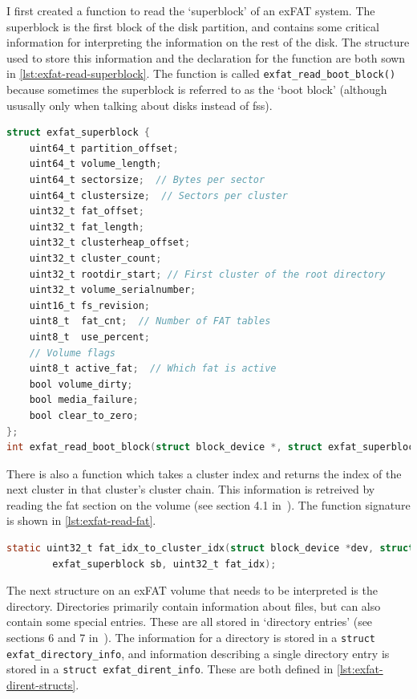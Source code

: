 \documentclass{article}
\begin{document}
I first created a function to read the `superblock' of an exFAT system. The
superblock is the first block of the disk partition, and contains some critical
information for interpreting the information on the rest of the disk. The
structure used to store this information and the declaration for the function
are both sown in \autoref{lst:exfat-read-superblock}. The function is called
\verb!exfat_read_boot_block()! because sometimes the superblock is referred to
as the `boot block' (although ususally only when talking about disks instead of
\glspl{fs}).

\begin{lstlisting}[language=C, caption={The structure used to represent the
                   exFAT superblock information, and the declaration of the
                   function used to read it}, float,
                   label={lst:exfat-read-superblock}]
struct exfat_superblock {
    uint64_t partition_offset;
    uint64_t volume_length;
    uint64_t sectorsize;  // Bytes per sector
    uint64_t clustersize;  // Sectors per cluster
    uint32_t fat_offset;
    uint32_t fat_length;
    uint32_t clusterheap_offset;
    uint32_t cluster_count;
    uint32_t rootdir_start; // First cluster of the root directory
    uint32_t volume_serialnumber;
    uint16_t fs_revision;
    uint8_t  fat_cnt;  // Number of FAT tables
    uint8_t  use_percent;
    // Volume flags
    uint8_t active_fat;  // Which fat is active
    bool volume_dirty;
    bool media_failure;
    bool clear_to_zero;
};
int exfat_read_boot_block(struct block_device *, struct exfat_superblock *);
\end{lstlisting}

There is also a function which takes a cluster index and returns the index of
the next cluster in that cluster's cluster chain. This information is retreived
by reading the \gls{fat} section on the volume (see section 4.1
in~\cite{exFAT-specs}). The function signature is shown in
\autoref{lst:exfat-read-fat}.

\begin{lstlisting}[language=C, caption={The function which is used to get the
                   cluster index of the next cluster in a cluster chain},
                   float, label={lst:exfat-read-fat}]
static uint32_t fat_idx_to_cluster_idx(struct block_device *dev, struct
        exfat_superblock sb, uint32_t fat_idx);
\end{lstlisting}

The next structure on an exFAT volume that needs to be interpreted is the
directory. Directories primarily contain information about files, but can also
contain some special entries. These are all stored in `directory entries' (see
sections 6 and 7 in~\cite{exFAT-specs}). The information for a directory is
stored in a \verb!struct exfat_directory_info!, and information describing a
single directory entry is stored in a \verb!struct exfat_dirent_info!. These
are both defined in \autoref{lst:exfat-dirent-structs}.
\end{document}
